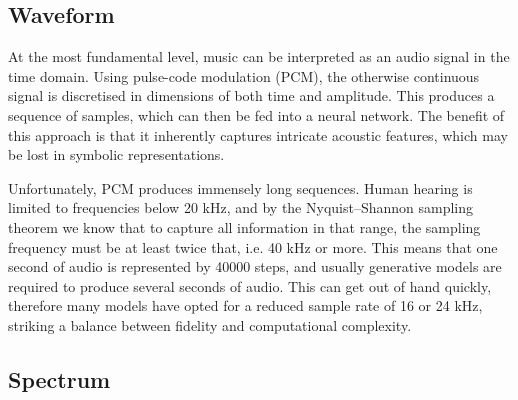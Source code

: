\documentclass[../../report.tex]{subfiles}
\begin{document}

\subsection{Waveform}

At the most fundamental level, music can be interpreted as an audio signal in
the time domain. Using pulse-code modulation (PCM), the otherwise continuous
signal is discretised in dimensions of both time and amplitude. This produces a
sequence of samples, which can then be fed into a neural network. The benefit of
this approach is that it inherently captures intricate acoustic features, which
may be lost in symbolic representations. \cite{Dieleman2020}

Unfortunately, PCM produces immensely long sequences. Human hearing is limited
to frequencies below \num{20} kHz, and by the Nyquist--Shannon sampling theorem
we know that to capture all information in that range, the sampling frequency
must be at least twice that, i.e. \num{40} kHz or more. This means that one
second of audio is represented by \num{40000} steps, and usually generative
models are required to produce several seconds of audio. This can get out of
hand quickly, therefore many models have opted for a reduced sample rate of
\num{16} or \num{24} kHz, striking a balance between fidelity and computational
complexity. \cite{Dieleman2020}


\subsection{Spectrum}



\end{document}
